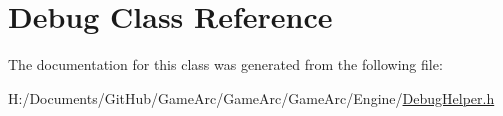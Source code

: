 \hypertarget{class_debug}{\section{Debug Class Reference}
\label{class_debug}
}


The documentation for this class was generated from the following file\+:\begin{DoxyCompactItemize}
\item 
H\+:/\+Documents/\+Git\+Hub/\+Game\+Arc/\+Game\+Arc/\+Game\+Arc/\+Engine/\hyperlink{_debug_helper_8h}{Debug\+Helper.\+h}\end{DoxyCompactItemize}
